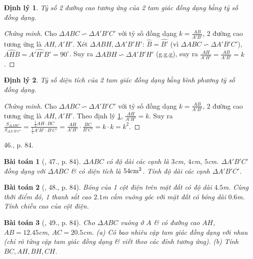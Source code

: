\documentclass{article}
\newtheorem{baitoan}{Bài toán}
\newtheorem{dinhly}{Định lý}
\begin{document}
\begin{dinhly}
	\label{thm: heights of similar triangles}
	Tỷ số 2 đường cao tương ứng của 2 tam giác đồng dạng bằng tỷ số đồng dạng.
\end{dinhly}

\begin{proof}[Chứng minh]
	Cho $\Delta ABC\backsim\Delta A'B'C'$ với tỷ số đồng dạng $k = \frac{AB}{A'B'}$, 2 đường cao tương ứng là $AH,A'H'$. Xét $\Delta ABH,\Delta A'B'H'$: $\widehat{B} = \widehat{B'}$ (vì $\Delta ABC\backsim\Delta A'B'C'$), $\widehat{AHB} = \widehat{A'H'B'} = 90^\circ$. Suy ra $\Delta ABH\backsim\Delta A'B'H'$ (g.g.g), suy ra $\frac{AH}{A'H'} = \frac{AB}{A'B'} = k$.
\end{proof}

\begin{dinhly}
	Tỷ số diện tích của 2 tam giác đồng dạng bằng bình phương tỷ số đồng dạng.
\end{dinhly}

\begin{proof}[Chứng minh]
	Cho $\Delta ABC\backsim\Delta A'B'C'$ với tỷ số đồng dạng $k = \frac{AB}{A'B'}$, 2 đường cao tương ứng là $AH,A'H'$. Theo định lý \ref{thm: heights of similar triangles}, $\frac{AH}{A'H'} = k$. Suy ra $\frac{S_{\Delta ABC}}{S_{\Delta A'B'C'}} = \frac{\frac{1}{2}AH\cdot BC}{\frac{1}{2}A'H'\cdot B'C'} = \frac{AH}{A'H'}\cdot\frac{BC}{B'C'} = k\cdot k = k^2$.
\end{proof}
46., p. 84.

\begin{baitoan}[\cite{SGK_Toan_8_tap_2}, 47., p. 84]
	$\Delta ABC$ có độ dài các cạnh là $3$\emph{cm}, $4$\emph{cm}, $5$\emph{cm}. $\Delta A'B'C'$ đồng dạng với $\Delta ABC$ \& có diện tích là $54{\rm cm}^2$. Tính độ dài các cạnh $\Delta A'B'C'$.
\end{baitoan}

\begin{baitoan}[\cite{SGK_Toan_8_tap_2}, 48., p. 84]
	Bóng của 1 cột điện trên mặt đất có độ dài $4.5$\emph{m}. Cùng thời điểm đó, 1 thanh sắt cao $2.1$\emph{m} cắm vuông góc với mặt đất có bóng dài $0.6$\emph{m}. Tính chiều cao của cột điện.
\end{baitoan}

\begin{baitoan}[\cite{SGK_Toan_8_tap_2}, 49., p. 84]
	Cho $\Delta ABC$ vuông ở $A$ \& có đường cao $AH$, $AB = 12.45$\emph{cm}, $AC = 20.5$\emph{cm}. (a) Có bao nhiêu cặp tam giác đồng dạng với nhau (chỉ rõ từng cặp tam giác đồng dạng \& viết theo các đỉnh tương ứng). (b) Tính $BC,AH,BH,CH$.
\end{baitoan}
\end{document}
